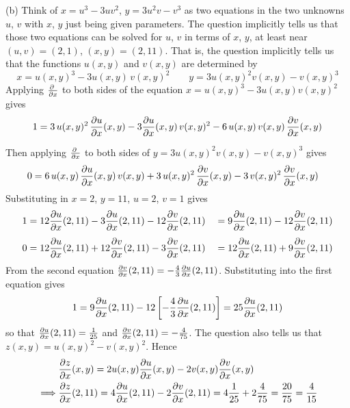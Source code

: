 \begin{solution}
(b) 
Think of $x=u^3-3uv^2$, $y=3u^2v-v^3$ as two equations in the two 
    unknowns $u$, $v$ with $x$, $y$ just being given parameters. The
    question implicitly tells us that those two equations can be solved
    for $u$, $v$ in terms of $x$, $y$, at least near
    $(u,v)=(2,1)$, $(x,y)=(2,11)$. That is, the question implicitly
    tells us that the functions $u(x,y)$ and $v(x,y)$ are determined by
\begin{equation*}
x=u(x,y)^3-3u(x,y)\,v(x,y)^2\qquad
y=3u(x,y)^2v(x,y)-v(x,y)^3
\end{equation*}
Applying $\pdiff{}{x}$ to both sides of the equation
$x=u(x,y)^3-3u(x,y)v(x,y)^2$ gives
\begin{align*}
1&=3\,u(x,y)^2\,\pdiff{u}{x}(x,y)
       -3\pdiff{u}{x}(x,y)\,v(x,y)^2
       -6\,u(x,y)\,v(x,y)\,\pdiff{v}{x}(x,y) \\[0.05in]
\end{align*}
Then applying $\pdiff{}{x}$ to both sides of $y=3u(x,y)^2v(x,y)-v(x,y)^3$ gives
\begin{align*}
0&=6\,u(x,y)\,\pdiff{u}{x}(x,y)\,v(x,y)
   +3\,u(x,y)^2\,\pdiff{v}{x}(x,y)
   -3\,v(x,y)^2\,\pdiff{v}{x}(x,y)
\end{align*}
Substituting in $x=2$, $y=11$, $u=2$, $v=1$ gives
\begin{alignat*}{3}
1&=12\pdiff{u}{x}(2,11)
       -3\pdiff{u}{x}(2,11)
       -12\pdiff{v}{x}(2,11)
&&=9\pdiff{u}{x}(2,11)
       -12\pdiff{v}{x}(2,11)\\[0.05in]
0&=12\pdiff{u}{x}(2,11)
   +12\pdiff{v}{x}(2,11)
   -3\pdiff{v}{x}(2,11)
&&=12\pdiff{u}{x}(2,11)
   +9\pdiff{v}{x}(2,11)
\end{alignat*}
From the second equation $\pdiff{v}{x}(2,11)
=-\frac{4}{3}\pdiff{u}{x}(2,11)$. Substituting into the
first equation gives 
\begin{equation*}
1=9\pdiff{u}{x}(2,11)
       -12\left[-\frac{4}{3}\pdiff{u}{x}(2,11)\right]
= 25\pdiff{u}{x}(2,11)
\end{equation*}
so that $\pdiff{u}{x}(2,11)=\frac{1}{25}$
and $\pdiff{v}{x}(2,11)=-\frac{4}{75}$.
The question also tells us that $z(x,y)=u(x,y)^2-v(x,y)^2$.
Hence
\begin{align*}
&\pdiff{z}{x}(x,y)
=2u(x,y)\pdiff{u}{x}(x,y)
    -2v(x,y)\pdiff{v}{x}(x,y)\\
\implies &
\pdiff{z}{x}(2,11)
=4\pdiff{u}{x}(2,11)
    -2\pdiff{v}{x}(2,11)
=4\frac{1}{25}+2\frac{4}{75}=\frac{20}{75}
=\frac{4}{15}
\end{align*}
\end{solution}


